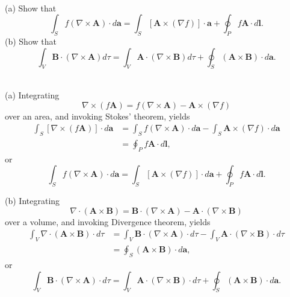 \begin{prob}[1.36]~\\
    \noindent (a) Show that
    \begin{equation}
        \int_Sf(\nabla\times\mathbf{A})\cdot d\mathbf{a} = \int_S[\mathbf{A}\times(\nabla f)]\cdot\mathbf{a} + \oint_P f\mathbf{A}\cdot d\mathbf{l}.
    \end{equation}
    \noindent (b) Show that
    \begin{equation}
        \int_V\mathbf{B}\cdot(\nabla\times\mathbf{A})d\tau = \int_V\mathbf{A}\cdot(\nabla\times\mathbf{B})d\tau + \oint_S(\mathbf{A}\times\mathbf{B})\cdot d\mathbf{a}.
    \end{equation}
\end{prob}
\begin{sol}[1.36]~\\
    \noindent (a)
    Integrating
    \begin{equation}
        \nabla\times(f\mathbf{A}) = f(\nabla\times\mathbf{A}) - \mathbf{A}\times(\nabla f)
    \end{equation}
    over an area, and invoking Stokes' theorem, yields
    \begin{equation}
        \begin{aligned}
            \int_S [\nabla\times(f\mathbf{A})]\cdot d\mathbf{a} &= \int_S f(\nabla\times\mathbf{A}) \cdot d\mathbf{a} - \int_S\mathbf{A}\times(\nabla f) \cdot d\mathbf{a}\\
            &= \oint_P f\mathbf{A}\cdot d\mathbf{l},
        \end{aligned}
    \end{equation}
    or
    \begin{equation}
        \int_S f(\nabla\times\mathbf{A})\cdot d\mathbf{a} = \int_S [\mathbf{A}\times(\nabla f)]\cdot d\mathbf{a} + \oint_P f\mathbf{A}\cdot d\mathbf{l}.
    \end{equation}

    \noindent (b)
    Integrating 
    \begin{equation}
        \nabla\cdot(\mathbf{A}\times\mathbf{B}) = \mathbf{B}\cdot(\nabla\times\mathbf{A}) - \mathbf{A}\cdot(\nabla\times\mathbf{B})
    \end{equation}
    over a volume, and invoking Divergence theorem, yields
    \begin{equation}
        \begin{aligned}
            \int_V\nabla\cdot(\mathbf{A}\times\mathbf{B})\cdot d\tau &= \int_V\mathbf{B}\cdot(\nabla\times\mathbf{A})\cdot d\tau - \int_V\mathbf{A}\cdot(\nabla\times\mathbf{B})\cdot d\tau \\
            &= \oint_S (\mathbf{A}\times\mathbf{B})\cdot d\mathbf{a},
        \end{aligned}
    \end{equation}
    or
    \begin{equation}
        \int_V\mathbf{B}\cdot(\nabla\times\mathbf{A})\cdot d\tau = \int_V\mathbf{A}\cdot(\nabla\times\mathbf{B})\cdot d\tau + \oint_S (\mathbf{A}\times\mathbf{B})\cdot d\mathbf{a}.
    \end{equation}
\end{sol}


